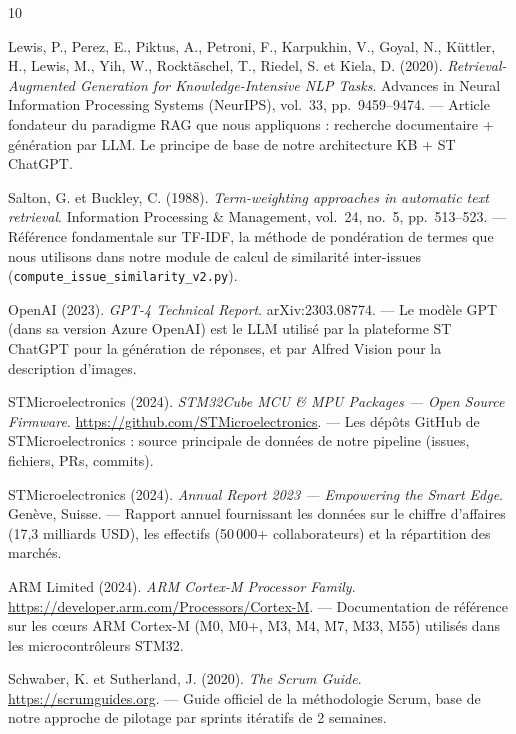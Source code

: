 \documentclass[12pt,a4paper]{report}
\begin{document}
\begin{thebibliography}{10}

Lewis, P., Perez, E., Piktus, A., Petroni, F., Karpukhin, V., Goyal, N., Küttler, H., Lewis, M., Yih, W., Rocktäschel, T., Riedel, S. et Kiela, D. (2020). \textit{Retrieval-Augmented Generation for Knowledge-Intensive NLP Tasks}. Advances in Neural Information Processing Systems (NeurIPS), vol.~33, pp.~9459--9474. --- Article fondateur du paradigme RAG que nous appliquons : recherche documentaire + génération par LLM. Le principe de base de notre architecture KB + ST ChatGPT.

Salton, G. et Buckley, C. (1988). \textit{Term-weighting approaches in automatic text retrieval}. Information Processing \& Management, vol.~24, no.~5, pp.~513--523. --- Référence fondamentale sur TF-IDF, la méthode de pondération de termes que nous utilisons dans notre module de calcul de similarité inter-issues (\texttt{compute\_issue\_similarity\_v2.py}).

OpenAI (2023). \textit{GPT-4 Technical Report}. arXiv:2303.08774. --- Le modèle GPT (dans sa version Azure OpenAI) est le LLM utilisé par la plateforme ST ChatGPT pour la génération de réponses, et par Alfred Vision pour la description d'images.

STMicroelectronics (2024). \textit{STM32Cube MCU \& MPU Packages --- Open Source Firmware}. \url{https://github.com/STMicroelectronics}. --- Les dépôts GitHub de STMicroelectronics : source principale de données de notre pipeline (issues, fichiers, PRs, commits).

STMicroelectronics (2024). \textit{Annual Report 2023 --- Empowering the Smart Edge}. Genève, Suisse. --- Rapport annuel fournissant les données sur le chiffre d'affaires (17,3 milliards USD), les effectifs (50\,000+ collaborateurs) et la répartition des marchés.

ARM Limited (2024). \textit{ARM Cortex-M Processor Family}. \url{https://developer.arm.com/Processors/Cortex-M}. --- Documentation de référence sur les cœurs ARM Cortex-M (M0, M0+, M3, M4, M7, M33, M55) utilisés dans les microcontrôleurs STM32.

Schwaber, K. et Sutherland, J. (2020). \textit{The Scrum Guide}. \url{https://scrumguides.org}. --- Guide officiel de la méthodologie Scrum, base de notre approche de pilotage par sprints itératifs de 2 semaines.


\end{thebibliography}
\end{document}
